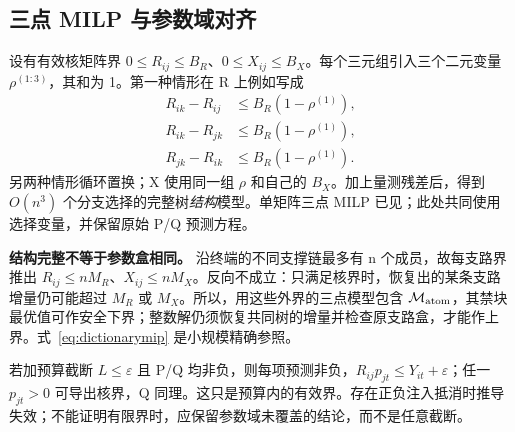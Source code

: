 \subsection{三点 MILP 与参数域对齐}
设有有效核矩阵界 $0\le R_{ij}\le B_R$、$0\le X_{ij}\le B_X$。每个三元组引入三个二元变量 $\rho^{(1:3)}$，其和为 1。第一种情形在 R 上例如写成
\begin{equation}
 \begin{aligned}
 R_{ik}-R_{ij}&\le B_R(1-\rho^{(1)}),\\
 R_{ik}-R_{jk}&\le B_R(1-\rho^{(1)}),\\
 R_{jk}-R_{ik}&\le B_R(1-\rho^{(1)}).
 \end{aligned}
 \label{eq:triplemip}
\end{equation}
另两种情形循环置换；X 使用同一组 $\rho$ 和自己的 $B_X$。加上量测残差后，得到 $O(n^3)$ 个分支选择的完整树\emph{结构}模型。单矩阵三点 MILP 已见\citet[Table~1]{bravo2009}；此处共同使用选择变量，并保留原始 P/Q 预测方程。

\textbf{结构完整不等于参数盒相同。} 沿终端的不同支撑链最多有 n 个成员，故每支路界推出 $R_{ij}\le nM_R$、$X_{ij}\le nM_X$。反向不成立：只满足核界时，恢复出的某条支路增量仍可能超过 $M_R$ 或 $M_X$。所以，用这些外界的三点模型包含 $\mathcal M_{\rm atom}$，其禁块最优值可作安全下界；整数解仍须恢复共同树的增量并检查原支路盒，才能作上界。式~\eqref{eq:dictionarymip} 是小规模精确参照。

若加预算截断 $L\le\varepsilon$ 且 P/Q 均非负，则每项预测非负，$R_{ij}p_{jt}\le Y_{it}+\varepsilon$；任一 $p_{jt}>0$ 可导出核界，Q 同理。这只是预算内的有效界。存在正负注入抵消时推导失效；不能证明有限界时，应保留参数域未覆盖的结论，而不是任意截断。

